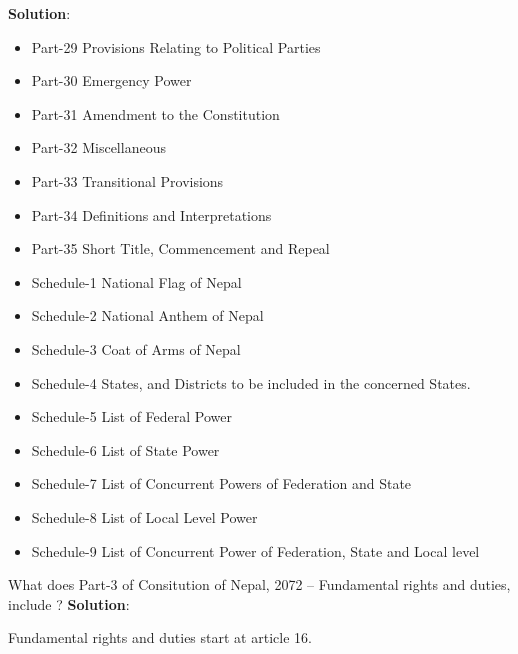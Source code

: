 \documentclass[
]{book}
\newcommand{\question}{\item}
\newenvironment{solution}{ {\bfseries Solution}:}{}
\begin{document}
\begin{questions}
\begin{solution}
\begin{itemize}
  \item Part-29 Provisions Relating to Political Parties
  \item Part-30 Emergency Power
  \item Part-31 Amendment to the Constitution
  \item Part-32 Miscellaneous
  \item Part-33 Transitional Provisions
  \item Part-34 Definitions and Interpretations
  \item Part-35 Short Title, Commencement and Repeal
  \item Schedule-1 National Flag of Nepal
  \item Schedule-2 National Anthem of Nepal
  \item Schedule-3 Coat of Arms of Nepal
  \item Schedule-4 States, and Districts to be included in the concerned States.
  \item Schedule-5 List of Federal Power
  \item Schedule-6 List of State Power
  \item Schedule-7 List of Concurrent Powers of Federation and State
  \item Schedule-8 List of Local Level Power
  \item Schedule-9 List of Concurrent Power of Federation, State and Local level
  \end{itemize}
  \end{solution}

\question What does Part-3 of Consitution of Nepal, 2072 -- Fundamental rights and duties, include ?
\begin{solution}

Fundamental rights and duties start at article 16.


\end{solution}
\end{questions}
\end{document}
